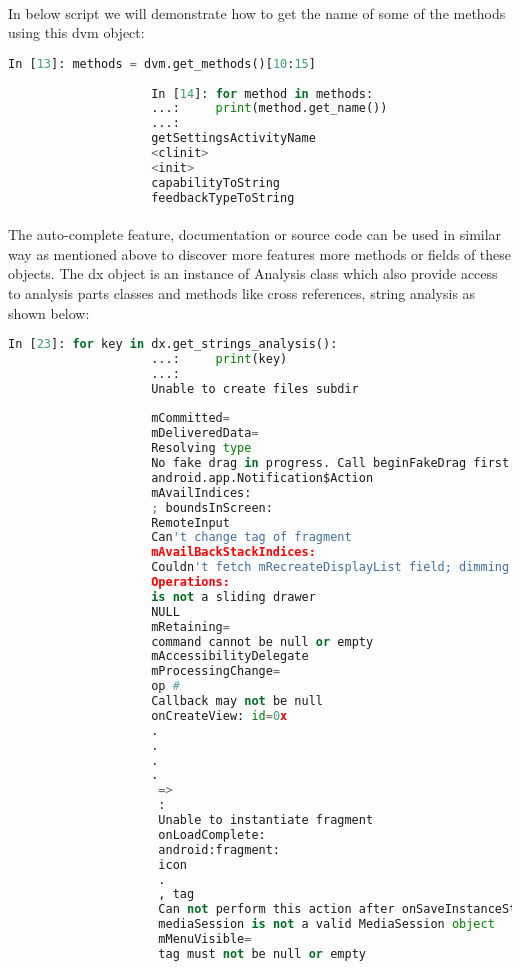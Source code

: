 \documentclass[../main.tex]{subfile}
\begin{document}
			\paragraph{} In below script we will demonstrate how to get the name of some of the methods using this dvm object:
				\begin{lstlisting}[language=python]
					In [13]: methods = dvm.get_methods()[10:15]
					
					In [14]: for method in methods:
					...:     print(method.get_name())
					...:     
					getSettingsActivityName
					<clinit>
					<init>
					capabilityToString
					feedbackTypeToString
				\end{lstlisting}
				
			\paragraph{} The auto-complete feature, documentation or source code can be used in similar way as mentioned above to discover more features more methods or fields of these objects. The dx object is an instance of Analysis class which also provide access to analysis parts classes and methods like cross references, string analysis as shown below:
				\begin{lstlisting}[language=python]
					In [23]: for key in dx.get_strings_analysis():
					...:     print(key)
					...:     
					Unable to create files subdir 
					
					mCommitted=
					mDeliveredData=
					Resolving type 
					No fake drag in progress. Call beginFakeDrag first.
					android.app.Notification$Action
					mAvailIndices: 
					; boundsInScreen: 
					RemoteInput
					Can't change tag of fragment 
					mAvailBackStackIndices: 
					Couldn't fetch mRecreateDisplayList field; dimming will be slow.
					Operations:
					is not a sliding drawer
					NULL
					mRetaining=
					command cannot be null or empty
					mAccessibilityDelegate
					mProcessingChange=
					op #
					Callback may not be null
					onCreateView: id=0x
					.
					.
					.
					.
					 => 
					 : 
					 Unable to instantiate fragment 
					 onLoadComplete: 
					 android:fragment:
					 icon
					 .
					 , tag 
					 Can not perform this action after onSaveInstanceState
					 mediaSession is not a valid MediaSession object
					 mMenuVisible=
					 tag must not be null or empty
					 
				\end{lstlisting}
\end{document}

